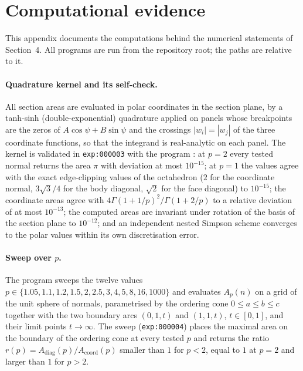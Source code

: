 \documentclass[11pt]{article}
\theoremstyle{plain}
\numberwithin{theorem}{section}
\begin{document}
\appendix
\section{Computational evidence}\label{app:computational}

This appendix documents the computations behind the numerical statements of Section~4. All programs are run from the repository root; the paths are relative to it.

\paragraph{Quadrature kernel and its self-check.} All section areas are evaluated in polar coordinates in the section plane, by a tanh-sinh (double-exponential) quadrature applied on panels whose breakpoints are the zeros of $A\cos\psi+B\sin\psi$ and the crossings $|w_i|=|w_j|$ of the three coordinate functions, so that the integrand is real-analytic on each panel. The kernel is validated in \texttt{exp:000003} with the program : at $p=2$ every tested normal returns the area $\pi$ with deviation at most $10^{-15}$; at $p=1$ the values agree with the exact edge-clipping values of the octahedron ($2$ for the coordinate normal, $3\sqrt3/4$ for the body diagonal, $\sqrt2$ for the face diagonal) to $10^{-15}$; the coordinate areas agree with $4\Gamma(1+1/p)^2/\Gamma(1+2/p)$ to a relative deviation of at most $10^{-13}$; the computed areas are invariant under rotation of the basis of the section plane to $10^{-12}$; and an independent nested Simpson scheme converges to the polar values within its own discretisation error.

\paragraph{Sweep over $p$.} The program  sweeps the twelve values $p\in\{1.05,1.1,1.2,1.5,2,2.5,3,4,5,8,16,1000\}$ and evaluates $A_p(n)$ on a grid of the unit sphere of normals, parametrised by the ordering cone $0\le a\le b\le c$ together with the two boundary arcs $(0,1,t)$ and $(1,1,t)$, $t\in[0,1]$, and their limit points $t\to\infty$. The sweep (\texttt{exp:000004}) places the maximal area on the boundary of the ordering cone at every tested $p$ and returns the ratio $r(p)=A_{\mathrm{diag}}(p)/A_{\mathrm{coord}}(p)$ smaller than $1$ for $p<2$, equal to $1$ at $p=2$ and larger than $1$ for $p>2$.
\end{document}
